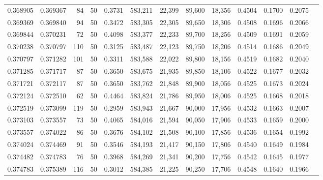 \begin{tabular}{rrrrrrrrrrrrr}
0.368905 & 0.369367 &    84 &  50 &                                     0.3731 & 583,211 &  22,399 &  89,600 &  18,356 & 0.4504 & 0.1700 & 0.2075 \\
0.369369 & 0.369840 &    94 &  50 &                                     0.3472 & 583,305 &  22,305 &  89,650 &  18,306 & 0.4508 & 0.1696 & 0.2066 \\
0.369844 & 0.370231 &    72 &  50 &                                     0.4098 & 583,377 &  22,233 &  89,700 &  18,256 & 0.4509 & 0.1691 & 0.2059 \\
0.370238 & 0.370797 &   110 &  50 &                                     0.3125 & 583,487 &  22,123 &  89,750 &  18,206 & 0.4514 & 0.1686 & 0.2049 \\
0.370797 & 0.371282 &   101 &  50 &                                     0.3311 & 583,588 &  22,022 &  89,800 &  18,156 & 0.4519 & 0.1682 & 0.2040 \\
0.371285 & 0.371717 &    87 &  50 &                                     0.3650 & 583,675 &  21,935 &  89,850 &  18,106 & 0.4522 & 0.1677 & 0.2032 \\
0.371721 & 0.372117 &    87 &  50 &                                     0.3650 & 583,762 &  21,848 &  89,900 &  18,056 & 0.4525 & 0.1673 & 0.2024 \\
0.372124 & 0.372510 &    62 &  50 &                                     0.4464 & 583,824 &  21,786 &  89,950 &  18,006 & 0.4525 & 0.1668 & 0.2018 \\
0.372519 & 0.373099 &   119 &  50 &                                     0.2959 & 583,943 &  21,667 &  90,000 &  17,956 & 0.4532 & 0.1663 & 0.2007 \\
0.373103 & 0.373557 &    73 &  50 &                                     0.4065 & 584,016 &  21,594 &  90,050 &  17,906 & 0.4533 & 0.1659 & 0.2000 \\
0.373557 & 0.374022 &    86 &  50 &                                     0.3676 & 584,102 &  21,508 &  90,100 &  17,856 & 0.4536 & 0.1654 & 0.1992 \\
0.374024 & 0.374469 &    91 &  50 &                                     0.3546 & 584,193 &  21,417 &  90,150 &  17,806 & 0.4540 & 0.1649 & 0.1984 \\
0.374482 & 0.374783 &    76 &  50 &                                     0.3968 & 584,269 &  21,341 &  90,200 &  17,756 & 0.4542 & 0.1645 & 0.1977 \\
0.374783 & 0.375389 &   116 &  50 &                                     0.3012 & 584,385 &  21,225 &  90,250 &  17,706 & 0.4548 & 0.1640 & 0.1966 \\

\end{tabular}
